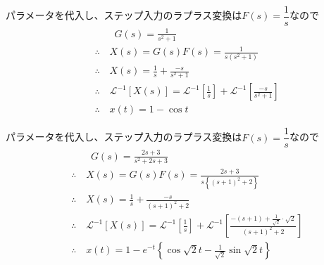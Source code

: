 \documentclass[a4paper,12pt]{article}
\begin{document}
\begin{tcolorbox}[title={5.(6)\quad \( m=1,d=0,k=1\)とし、ステップ応答を求めよ。
    }]
    パラメータを代入し、ステップ入力のラプラス変換は\(F(s)=\dfrac{1}{s}\)なので
    \vspace{-4mm}
    \begin{align*}
        &\qquad G(s) = \frac{1}{s^2 + 1} \\
        &\therefore \quad X(s) = G(s) F(s) = \frac{1}{s(s^2+1)} \\
        &\therefore \quad X(s) = \frac{1}{s}+\frac{-s}{s^2+1} \\
        &\therefore \quad \mathcal{L}^{-1} \left[ X(s)\right] 
        = \mathcal{L}^{-1} \left[\frac{1}{s}\right] 
        + \mathcal{L}^{-1} \left[\frac{-s}{s^2+1} \right] \\
        &\therefore \quad x(t) = 1 - \cos t
    \end{align*}
\end{tcolorbox}
\begin{tcolorbox}[title={5.(7)\quad \( m=1,d=2,k=3\)とし、ステップ応答を求めよ。
    }]
    パラメータを代入し、ステップ入力のラプラス変換は\(F(s)=\dfrac{1}{s}\)なので
    \vspace{-4mm}
    \begin{align*}
        &\qquad G(s) = \frac{2s+3}{s^2 + 2s+ 3} \\
        &\therefore \quad X(s) = G(s) F(s) = \frac{2s+3}{s\left\{(s+1)^2+2\right\}} \\
        &\therefore \quad X(s) = \frac{1}{s}+\frac{-s}{(s+1)^2+2} \\
        &\therefore \quad \mathcal{L}^{-1} \left[ X(s)\right] 
        = \mathcal{L}^{-1} \left[\frac{1}{s}\right] 
        + \mathcal{L}^{-1} \left[\frac{-(s+1) + \frac{1}{\sqrt{2}}\cdot \sqrt{2}}{(s+1)^2+2} \right] \\
        &\therefore \quad x(t) = 1 - e^{-t} \left\{ \cos \sqrt{2}t - \frac{1}{\sqrt{2}} \sin \sqrt{2}t \right\}
    \end{align*}
\end{tcolorbox}
\end{document}
